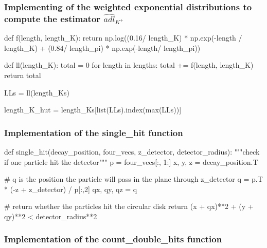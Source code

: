 \documentclass[12pt,a4paper,oneside,english]{article}
\begin{document}
\subsubsection{Implementing of the weighted exponential distributions to compute the estimator $\widehat{adl}_{K^+}$}
\label{subsubse: estimator_code}
\begin{shaded}
\begin{python}
def f(length, length_K):
    return np.log((0.16/ length_K) * np.exp(-length / length_K) + (0.84/ length_pi) * np.exp(-length/ length_pi))

def ll(length_K):
    total = 0
    for length in lengths:
        total += f(length, length_K)
    return total

LLs = ll(length_Ks)

length_K_hut = length_Ks[list(LLs).index(max(LLs))]
\end{python}
\end{shaded}
\subsubsection{Implementation of the single\_hit function}
\label{subsubse: single_hit_code}
\begin{shaded}
	\begin{python}
def single_hit(decay_position, four_vecs, z_detector, detector_radius):
"""check if one particle hit the detector"""
	p = four_vecs[:, 1:]
	x, y, z = decay_position.T
	
	# q is the position the particle will pass in the plane through z_detector
	q = p.T * (-z + z_detector) / p[:,2]
	qx, qy, qz = q
	
	# return whether the particles hit the circular disk
	return (x + qx)**2 + (y + qy)**2 < detector_radius**2
	
		\end{python}
\end{shaded}


\subsubsection{Implementation of the count\_double\_hits function}
\label{subsubse: double_hit_code}
\end{document}

